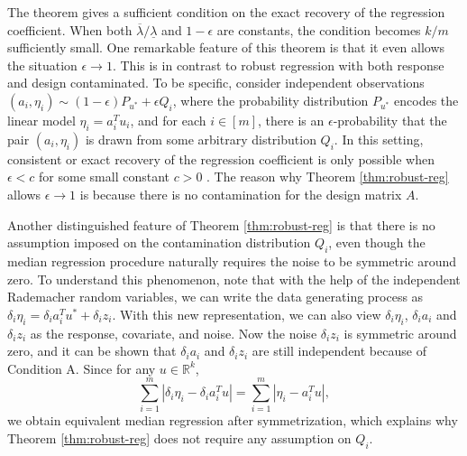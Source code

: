 The theorem gives a sufficient condition on the exact recovery of the regression coefficient. When both $\overline{\lambda}/\underline{\lambda}$ and $1-\epsilon$ are constants, the condition becomes $k/m$ sufficiently small. One remarkable feature of this theorem is that it even allows the situation $\epsilon\rightarrow 1$. This is in contrast to robust regression with both response and design contaminated. To be specific, consider independent observations $(a_i,\eta_i)\sim (1-\epsilon)P_{u^*}+\epsilon Q_i$, where the probability distribution $P_{u^*}$ encodes the linear model $\eta_i=a_i^Tu_i$, and for each $i\in[m]$, there is an $\epsilon$-probability that the pair $(a_i,\eta_i)$ is drawn from some arbitrary distribution $Q_i$. In this setting, consistent or exact recovery of the regression coefficient is only possible when $\epsilon<c$ for some small constant $c>0$ \citep{gao2020}. The reason why Theorem \ref{thm:robust-reg} allows $\epsilon\rightarrow 1$ is because there is no contamination for the design matrix $A$.

Another distinguished feature of Theorem \ref{thm:robust-reg} is that there is no assumption imposed on the contamination distribution $Q_i$, even though the median regression procedure naturally requires the noise to be symmetric around zero. To understand this phenomenon, note that with the help of the independent Rademacher random variables, we can write the data generating process as $\delta_i\eta_i=\delta_ia_i^Tu^*+\delta_iz_i$. With this new representation, we can also view $\delta_i\eta_i$, $\delta_ia_i$ and $\delta_iz_i$ as the response, covariate, and noise. Now the noise $\delta_iz_i$ is symmetric around zero, and it can be shown that $\delta_ia_i$ and $\delta_iz_i$ are still independent because of Condition A. Since for any $u\in\mathbb{R}^k$,
$$\sum_{i=1}^m|\delta_i\eta_i- \delta_ia_i^Tu|=\sum_{i=1}^m|\eta_i-a_i^Tu|,$$
we obtain equivalent median regression after symmetrization, which explains why Theorem \ref{thm:robust-reg} does not require any assumption on $Q_i$.